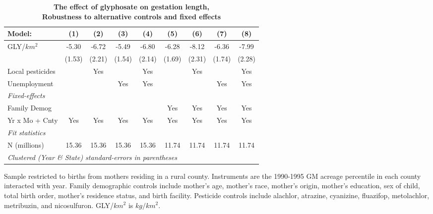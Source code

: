 \begin{table}[htbp]
   \centering
   \small
   \begin{threeparttable}[b]
      \caption{\label{tab:robust-cntrl-gestation-percentilegmacres} \textbf{The effect of glyphosate on gestation length, \\ Robustness to alternative controls and fixed effects}}
      \begin{tabular}{lcccccccc}
         \toprule
         Model:           & (1)    & (2)    & (3)    & (4)    & (5)    & (6)    & (7)    & (8)\\  
         \midrule 
         GLY/$km^2$       & -5.30  & -6.72  & -5.49  & -6.80  & -6.28  & -8.12  & -6.36  & -7.99\\   
                          & (1.53) & (2.21) & (1.54) & (2.14) & (1.69) & (2.31) & (1.74) & (2.28)\\   
         Local pesticides &        & Yes    &        & Yes    &        & Yes    &        & Yes\\  
         Unemployment     &        &        & Yes    & Yes    &        &        & Yes    & Yes\\  
         \midrule
         \emph{Fixed-effects}\\
         Family Demog     &        &        &        &        & Yes    & Yes    & Yes    & Yes\\  
         Yr x Mo + Cnty   & Yes    & Yes    & Yes    & Yes    & Yes    & Yes    & Yes    & Yes\\  
         \midrule
         \emph{Fit statistics}\\
         N (millions)     & 15.36  & 15.36  & 15.36  & 15.36  & 11.74  & 11.74  & 11.74  & 11.74\\  
         \midrule
         \multicolumn{9}{l}{\emph{Clustered (Year \& State) standard-errors in parentheses}}\\
      \end{tabular}
      
      \begin{tablenotes}\item Sample restricted to births from mothers residing in a rural county. Instruments are the 1990-1995 GM acreage percentile in each county interacted with year. Family demographic controls include mother's age, mother's race, mother's origin, mother's education, sex of child, total birth order, mother's residence status, and birth facility. Pesticide controls include alachlor, atrazine, cyanizine, fluazifop, metolachlor, metribuzin, and nicosulfuron. GLY/$km^2$ is $kg/km^2$.
      \end{tablenotes}
   \end{threeparttable}
\end{table}
